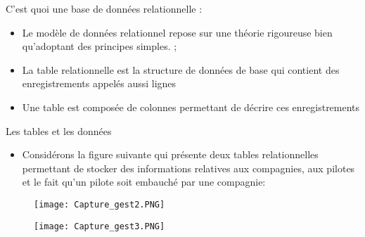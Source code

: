 \documentclass{beamer}
\begin{document}
\begin{frame}{C'est quoi une base de donn\'ees relationnelle :}
    \begin{itemize}
        \item Le mod\`ele  de donn\'ees relationnel repose sur une th\'eorie rigoureuse bien qu'adoptant des principes simples. ;
        \item La table relationnelle  est la structure de donn\'ees de base qui contient des enregistrements appel\'es aussi \og lignes \fg
        \item Une table est compos\'ee de colonnes permettant de d\'ecrire ces enregistrements
    \end{itemize}
\end{frame}
\begin{frame}{Les tables et les donn\'ees}
\begin{itemize}
        \item Consid\'erons la figure suivante qui pr\'esente deux tables relationnelles permettant de stocker des informations relatives aux compagnies, aux pilotes et le fait qu'un pilote soit embauch\'e par une compagnie:
       
    \end{itemize}
 
    \begin{figure}[h]
\centering	
 \texttt{[image: Capture\_gest2.PNG]}
\end{figure}

   \begin{figure}[h]
\centering	
 \texttt{[image: Capture\_gest3.PNG]}
\end{figure}
    \end{frame}   
        
\end{document}
